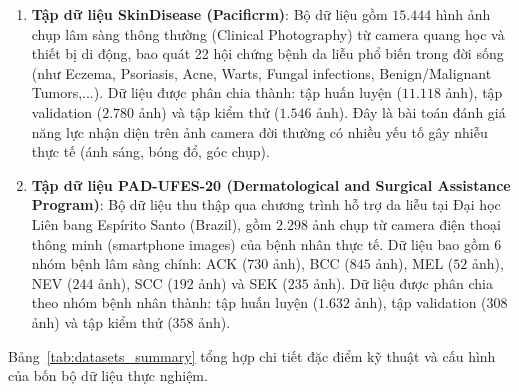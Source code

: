 \begin{enumerate}[label=\textbf{\arabic*.}]
  \item \textbf{Tập dữ liệu SkinDisease (Pacificrm)}:
  Bộ dữ liệu gồm $15.444$ hình ảnh chụp lâm sàng thông thường (Clinical Photography) từ camera quang học và thiết bị di động, bao quát 22 hội chứng bệnh da liễu phổ biến trong đời sống (như Eczema, Psoriasis, Acne, Warts, Fungal infections, Benign/Malignant Tumors,...). Dữ liệu được phân chia thành: tập huấn luyện ($11.118$ ảnh), tập validation ($2.780$ ảnh) và tập kiểm thử ($1.546$ ảnh). Đây là bài toán đánh giá năng lực nhận diện trên ảnh camera đời thường có nhiều yếu tố gây nhiễu thực tế (ánh sáng, bóng đổ, góc chụp).

  \item \textbf{Tập dữ liệu PAD-UFES-20 (Dermatological and Surgical Assistance Program)}:
  Bộ dữ liệu thu thập qua chương trình hỗ trợ da liễu tại Đại học Liên bang Espírito Santo (Brazil), gồm $2.298$ ảnh chụp từ camera điện thoại thông minh (smartphone images) của bệnh nhân thực tế. Dữ liệu bao gồm 6 nhóm bệnh lâm sàng chính: ACK ($730$ ảnh), BCC ($845$ ảnh), MEL ($52$ ảnh), NEV ($244$ ảnh), SCC ($192$ ảnh) và SEK ($235$ ảnh). Dữ liệu được phân chia theo nhóm bệnh nhân thành: tập huấn luyện ($1.632$ ảnh), tập validation ($308$ ảnh) và tập kiểm thử ($358$ ảnh).
\end{enumerate}

Bảng~\ref{tab:datasets_summary} tổng hợp chi tiết đặc điểm kỹ thuật và cấu hình của bốn bộ dữ liệu thực nghiệm.

\begin{table}[htbp]
\centering
\caption{Tổng hợp đặc tính các bộ dữ liệu hình ảnh da liễu thực nghiệm trong đề tài}
\label{tab:datasets_summary}
\small
{}
\end{table}

